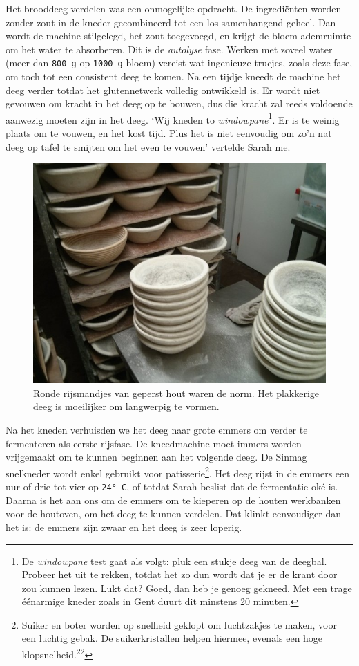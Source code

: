 \documentclass[
  11pt,
  dutch,
]{memoir}
\begin{document}
Het brooddeeg verdelen was een onmogelijke opdracht. De ingrediënten
worden zonder zout in de kneder gecombineerd tot een los samenhangend
geheel. Dan wordt de machine stilgelegd, het zout toegevoegd, en krijgt
de bloem ademruimte om het water te absorberen. Dit is de
\emph{autolyse} fase. Werken met zoveel water (meer dan \texttt{800\ g}
op \texttt{1000\ g} bloem) vereist wat ingenieuze trucjes, zoals deze
fase, om toch tot een consistent deeg te komen. Na een tijdje kneedt de
machine het deeg verder totdat het glutennetwerk volledig ontwikkeld is.
Er wordt niet gevouwen om kracht in het deeg op te bouwen, dus die
kracht zal reeds voldoende aanwezig moeten zijn in het deeg. `Wij kneden
to \emph{windowpane}\footnote{De \emph{windowpane} test gaat als volgt:
  pluk een stukje deeg van de deegbal. Probeer het uit te rekken, totdat
  het zo dun wordt dat je er de krant door zou kunnen lezen. Lukt dat?
  Goed, dan heb je genoeg gekneed. Met een trage éénarmige kneder zoals
  in Gent duurt dit minstens 20 minuten.}. Er is te weinig plaats om te
vouwen, en het kost tijd. Plus het is niet eenvoudig om zo'n nat deeg op
tafel te smijten om het even te vouwen' vertelde Sarah me.

\begin{figure}
    \centering
    \includegraphics{img/bw/mandjes.jpg}
    \caption[Ronde rijsmandjes van geperst hout.]{Ronde rijsmandjes van geperst hout waren de norm. Het plakkerige deeg is moeilijker om langwerpig te vormen.}
\end{figure}

Na het kneden verhuisden we het deeg naar grote emmers om verder te
fermenteren als eerste rijsfase. De kneedmachine moet immers worden
vrijgemaakt om te kunnen beginnen aan het volgende deeg. De Sinmag
snelkneder wordt enkel gebruikt voor patisserie\footnote{Suiker en boter
  worden op snelheid geklopt om luchtzakjes te maken, voor een luchtig
  gebak. De suikerkristallen helpen hiermee, evenals een hoge
  klopsnelheid.\textsuperscript{22}}. Het deeg rijst in de emmers een
uur of drie tot vier op \texttt{24°\ C}, of totdat Sarah beslist dat de
fermentatie oké is. Daarna is het aan ons om de emmers om te kieperen op
de houten werkbanken voor de houtoven, om het deeg te kunnen verdelen.
Dat klinkt eenvoudiger dan het is: de emmers zijn zwaar en het deeg is
zeer loperig.
\end{document}
